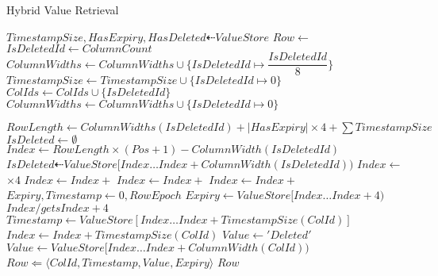 \documentclass[fleqn]{article}
\begin{document}
\begin{algorithm}
\scriptsize
\caption{Hybrid Value Retrieval}
\begin{algorithmic}[1]
\State $TimestampSize, HasExpiry, HasDeleted \dashleftarrow ValueStore$
\State $Row \gets $ 
\State $IsDeletedId \gets ColumnCount$
 \State $ColumnWidths \gets ColumnWidths \cup \{ IsDeletedId \mapsto $\tiny$\dfrac{IsDeletedId}{8}$\scriptsize$\}$
 \State $TimestampSize \gets TimestampSize \cup \{ IsDeletedId \mapsto 0\}$
 \State $ColIds \gets ColIds \cup \{ IsDeletedId \}$
\Else
 \State $ColumnWidths \gets ColumnWidths \cup \{ IsDeletedId \mapsto 0\}$
\EndIf

\State $RowLength \gets ColumnWidths(IsDeletedId) + \lvert HasExpiry \rvert \times 4 + \sum{TimestampSize}$
\State $IsDeleted \gets \emptyset$
 \State $Index \gets RowLength \times (Pos + 1) - ColumnWidth(IsDeletedId)$
 \State $IsDeleted \dashleftarrow ValueStore[Index \dots Index + ColumnWidth(IsDeletedId))$
\EndIf
{}
 \State $Index \gets $ $\times 4$
 \State $Index \gets Index + $
 \State $Index \gets Index + $
 \State $Index \gets Index + $
 \State $Expiry, Timestamp \gets 0, RowEpoch$
  \State $Expiry \gets ValueStore[Index\dots Index + 4)$
  \State $Index /gets Index + 4$
 \EndIf 
 \State $Timestamp \gets ValueStore[Index \dots Index+TimestampSize(ColId)]$
 \State $Index \gets Index+TimestampSize(ColId)$
  \State $Value \gets 'Deleted'$
 \Else
  \State $Value \gets ValueStore[Index \dots Index + ColumnWidth(ColId))$
 \EndIf
 \State $Row \Leftarrow \langle ColId, Timestamp, Value, Expiry \rangle$
\EndFor
\State \Return $Row$
\EndFunction
\end{algorithmic}
\end{algorithm}
\end{document}
